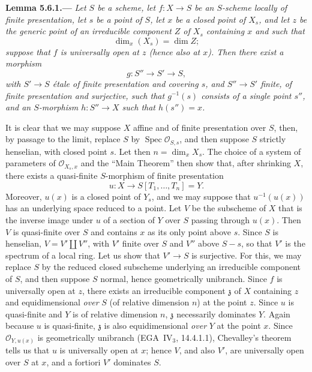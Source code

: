 
\medskip
{}\label{lem:sga3-VIB-5.6.1}%
\noindent\textbf{Lemma 5.6.1.---}
\emph{Let \(S\) be a scheme, let \(f:X\to S\) be an \(S\)-scheme
locally of finite presentation, let \(s\) be a point of \(S\), let \(x\)
be a closed point of \(X_s\), and let \(z\) be the generic point of an
irreducible component \(Z\) of \(X_s\) containing \(x\) and such that
\[
  \dim_x(X_s)=\dim Z;
\]
suppose that \(f\) is universally open at \(z\) \textup{(}hence also at
\(x\)\textup{)}. Then there exist a morphism
\[
  g:S''\longrightarrow S'\longrightarrow S,
\]
with \(S'\to S\) \'etale of finite presentation and covering \(s\), and
\(S''\to S'\) finite, of finite presentation and surjective, such that
\(g^{-1}(s)\) consists of a single point \(s''\), and an
\(S\)-morphism \(h:S''\to X\) such that \(h(s'')=x\).}

It is clear that we may suppose \(X\) affine and of finite presentation
over \(S\), then, by passage to the limit, replace \(S\) by
\(\operatorname{Spec}\mathcal O_{S,s}\), and then suppose \(S\) strictly
henselian, with closed point \(s\). Let then \(n=\dim_xX_s\). The choice of
a system of parameters of \(\mathcal O_{X_s,x}\) and the ``Main Theorem''
then show that, after shrinking \(X\), there exists a quasi-finite
\(S\)-morphism of finite presentation
\[
  u:X\longrightarrow S[T_1,\ldots,T_n]=Y.
\]
Moreover, \(u(x)\) is a closed point of \(Y_s\), and we may suppose that
\(u^{-1}(u(x))\) has an underlying space reduced to a point. Let \(V\) be
the subscheme of \(X\) that is the inverse image under \(u\) of a section
of \(Y\) over \(S\) passing through \(u(x)\). Then \(V\) is quasi-finite
over \(S\) and contains \(x\) as its only point above \(s\). Since \(S\)
is henselian, \(V=V'\amalg V''\), with \(V'\) finite over \(S\) and
\(V''\) above \(S-s\), so that \(V'\) is the spectrum of a local ring.
Let us show that \(V'\to S\) is surjective. For this, we may replace \(S\)
by the reduced closed subscheme underlying an irreducible component of
\(S\), and then suppose \(S\) normal, hence geometrically unibranch. Since
\(f\) is universally open at \(z\), there exists an irreducible component
\(\mathfrak z\) of \(X\) containing \(z\) and equidimensional \emph{over}
\(S\) (of relative dimension \(n\)) at the point \(z\). Since \(u\) is
quasi-finite and \(Y\) is of relative dimension \(n\), \(\mathfrak z\)
necessarily dominates \(Y\). Again because \(u\) is quasi-finite,
\(\mathfrak z\) is also equidimensional \emph{over} \(Y\) at the point
\(x\). Since \(\mathcal O_{Y,u(x)}\) is geometrically unibranch
(EGA~IV\(_3\), 14.4.1.1), Chevalley's theorem tells us that \(u\) is
universally open at \(x\); hence \(V\), and also \(V'\), are universally
open over \(S\) at \(x\), and a fortiori \(V'\) dominates \(S\).

